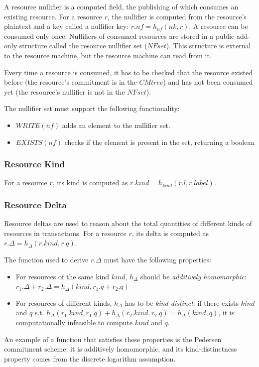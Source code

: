 A resource nullifier is a computed field, the publishing of which consumes an existing resource. For a resource $r$, the nullifier is computed from the resource's plaintext and a key called a nullifier key: $r.nf = h_{nf}(nk, r)$. A resource can be consumed only once. Nullifiers of consumed resources are stored in a public add-only structure called the resource nullifier set ($NFset$). This structure is external to the resource machine, but the resource machine can read from it.

Every time a resource is consumed, it has to be checked that the resource existed before (the resource's commitment is in the $CMtree$) and has not been consumed yet (the resource's nullifier is not in the $NFset$).

The nullifier set must support the following functionality:
\begin{itemize}
    \item $WRITE(nf)$ adds an element to the nullifier set. 
    \item $EXISTS(nf)$ checks if the element is present in the set, returning a boolean

\end{itemize}
\subsubsection{Resource Kind}
For a resource $r$, its kind is computed as $r.kind = h_{kind}(r.l, r.label)$.

\subsubsection{Resource Delta}\label{delta-resource}
Resource deltas are used to reason about the total quantities of different kinds of resources in transactions. For a resource $r$, its delta is computed as $r.\Delta = h_{\Delta}(r.kind, r.q)$.

\begin{remark}
    The function used to derive $r.\Delta$ must have the following properties:
    \begin{itemize}
    \item For resources of the same kind $kind$, $h_{\Delta}$ should be \textit{additively homomorphic}:
$r_1.\Delta + r_2.\Delta = h_{\Delta}(kind, r_1.q + r_2.q)$
    \item For resources of different kinds, $h_\Delta$ has to be \textit{kind-distinct}: if there exists $kind$ and $q$ s.t. $h_\Delta(r_1.kind, r_1.q) + h_\Delta(r_2.kind, r_2.q) = h_\Delta(kind, q)$, it is computationally infeasible to compute $kind$ and $q$.
\end{itemize}

An example of a function that satisfies these properties is the Pedersen commitment scheme: it is additively homomorphic, and its kind-distinctness property comes from the discrete logarithm assumption.
\end{remark}


